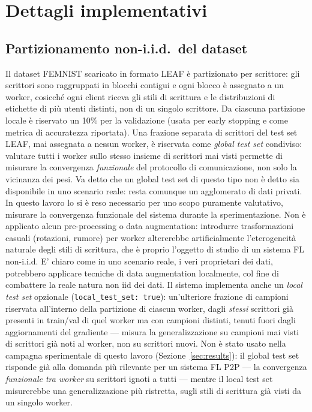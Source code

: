 \section{Dettagli implementativi}
\label{sec:details}

\subsection{Partizionamento non-i.i.d.\ del dataset}
Il dataset FEMNIST scaricato in formato LEAF è partizionato per scrittore:
gli scrittori sono raggruppati in blocchi contigui e ogni blocco è assegnato
a un worker, cosicché ogni client riceva gli stili di scrittura e le
distribuzioni di etichette di più utenti distinti, non di un singolo
scrittore. Da ciascuna partizione locale è riservato un 10\% per la
validazione (usata per early stopping e come metrica di accuratezza
riportata). Una frazione separata di scrittori del test set LEAF, mai
assegnata a nessun worker, è riservata come \emph{global test set} condiviso:
valutare tutti i worker sullo stesso insieme di scrittori mai visti permette
di misurare la convergenza \emph{funzionale} del protocollo di comunicazione,
non solo la vicinanza dei pesi. Va detto che un global test set di questo
tipo non è detto sia disponibile in uno scenario reale: resta comunque un
agglomerato di dati privati. In questo lavoro lo si
è reso necessario per uno scopo puramente valutativo, misurare la
convergenza funzionale del sistema durante la sperimentazione. Non è applicato alcun pre-processing o data
augmentation: introdurre trasformazioni casuali (rotazioni, rumore) per worker
altererebbe artificialmente l'eterogeneità naturale degli stili di
scrittura, che è proprio l'oggetto di studio di un sistema FL non-i.i.d.
E' chiaro come in uno scenario reale, i veri proprietari dei dati, potrebbero applicare tecniche di data augmentation localmente,
col fine di combattere la reale natura non iid dei dati. Il sistema implementa
anche un \emph{local test set} opzionale (\texttt{local\_test\_set: true}):
un'ulteriore frazione di campioni riservata all'interno della partizione di
ciascun worker, dagli \emph{stessi} scrittori già presenti in train/val di
quel worker ma con campioni distinti, tenuti fuori dagli aggiornamenti del
gradiente — misura la generalizzazione su campioni mai visti di scrittori
già noti al worker, non su scrittori nuovi. Non è stato usato nella campagna sperimentale di questo
lavoro (Sezione~\ref{sec:results}): il global test set risponde già alla
domanda più rilevante per un sistema FL P2P — la convergenza
\emph{funzionale tra worker} su scrittori ignoti a tutti — mentre il local
test set misurerebbe una generalizzazione più ristretta, sugli stili di
scrittura già visti da un singolo worker.

